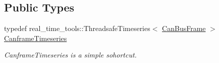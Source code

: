 \subsection*{Public Types}
\begin{DoxyCompactItemize}
\item 
\mbox{\label{classblmc__drivers_1_1CanBusInterface_a2da2627c961927f48359ae7d7e1aa4da}} 
typedef real\+\_\+time\+\_\+tools\+::\+Threadsafe\+Timeseries$<$ \hyperlink{classblmc__drivers_1_1CanBusFrame}{Can\+Bus\+Frame} $>$ \hyperlink{classblmc__drivers_1_1CanBusInterface_a2da2627c961927f48359ae7d7e1aa4da}{Canframe\+Timeseries}
\begin{DoxyCompactList}\small\item\em Canframe\+Timeseries is a simple sohortcut. \end{DoxyCompactList}\end{DoxyCompactItemize}
